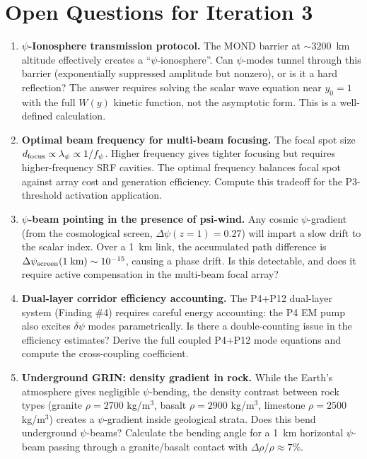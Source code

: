 \documentclass[aps,prd,twocolumn,superscriptaddress]{revtex4-2}
\begin{document}
\section{Open Questions for Iteration 3}
\label{sec:open}

\begin{enumerate}

\item \textbf{$\psi$-Ionosphere transmission protocol.}
The MOND barrier at $\sim 3200$~km altitude effectively creates a
``$\psi$-ionosphere''.  Can $\psi$-modes tunnel through this barrier
(exponentially suppressed amplitude but nonzero), or is it a
hard reflection?  The answer requires solving the scalar wave equation
near $y_0 = 1$ with the full $W(y)$ kinetic function, not the asymptotic
form.  This is a well-defined calculation.

\item \textbf{Optimal beam frequency for multi-beam focusing.}
The focal spot size $d_{\rm focus} \propto \lambda_\psi \propto 1/f_\psi$.
Higher frequency gives tighter focusing but requires higher-frequency
SRF cavities.  The optimal frequency balances focal spot against array
cost and generation efficiency.  Compute this tradeoff for the
P3-threshold activation application.

\item \textbf{$\psi$-beam pointing in the presence of psi-wind.}
Any cosmic $\psi$-gradient (from the cosmological screen, $\Delta\psi(z=1) = 0.27$)
will impart a slow drift to the scalar index.  Over a 1~km link, the
accumulated path difference is $\Delta\psi_{\rm screen}(1\;\text{km}) \sim 10^{-15}$,
causing a phase drift.  Is this detectable, and does it require active
compensation in the multi-beam focal array?

\item \textbf{Dual-layer corridor efficiency accounting.}
The P4+P12 dual-layer system (Finding \#4) requires careful energy
accounting: the P4 EM pump also excites $\delta\psi$ modes parametrically.
Is there a double-counting issue in the efficiency estimates?  Derive
the full coupled P4+P12 mode equations and compute the cross-coupling
coefficient.

\item \textbf{Underground GRIN: density gradient in rock.}
While the Earth's atmosphere gives negligible $\psi$-bending, the
density contrast between rock types (granite $\rho = 2700$ kg/m$^3$,
basalt $\rho = 2900$ kg/m$^3$, limestone $\rho = 2500$ kg/m$^3$) creates
a $\psi$-gradient inside geological strata.  Does this bend underground
$\psi$-beams?  Calculate the bending angle for a 1~km horizontal
$\psi$-beam passing through a granite/basalt contact with
$\Delta\rho/\rho \approx 7\%$.


\end{enumerate}
\end{document}

